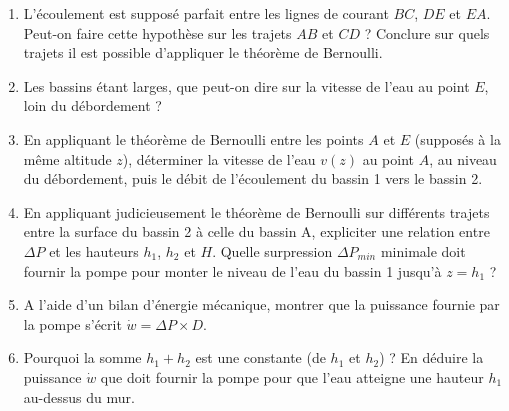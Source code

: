 \begin{enumerate}

	\item L'écoulement est supposé parfait entre les lignes de courant $BC$, $DE$ et $EA$. Peut-on faire cette hypothèse sur les trajets $AB$ et $CD$ ? Conclure sur quels trajets il est possible d'appliquer le théorème de Bernoulli.

	
	
	\item Les bassins étant larges, que peut-on dire sur la vitesse de l'eau au point $E$, loin du débordement ?
	
	\item En appliquant le théorème de Bernoulli entre les points $A$ et $E$ (supposés à la même altitude $z$), déterminer la vitesse de l'eau $v(z)$ au point $A$, au niveau du débordement, puis le débit de l'écoulement du bassin 1 vers le bassin 2.
	
	\item En appliquant judicieusement le théorème de Bernoulli sur différents trajets entre la surface du bassin 2 à celle du bassin A, expliciter une relation entre $\Delta P$ et les hauteurs $h_1$, $h_2$ et $H$.  Quelle surpression $\Delta P_{min}$ minimale doit fournir la pompe pour monter le niveau de l'eau du bassin 1 jusqu'à $z=h_1$ ?
	
	\item A l'aide d'un bilan d'énergie mécanique, montrer que la puissance fournie par la pompe s'écrit $\dot{w}=\Delta P\times D$. 
	
	\item Pourquoi la somme $h_1+h_2$ est une constante (de $h_1$ et $h_2$) ? En déduire la puissance $\dot{w}$ que doit fournir la pompe pour que l'eau atteigne une hauteur $h_1$ au-dessus du mur.

\end{enumerate}

\newpage

